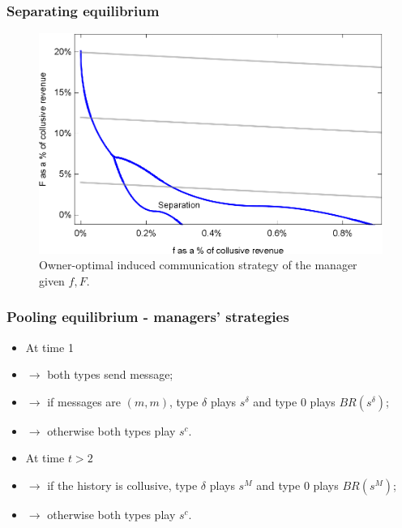 \documentclass[xcolor=dvipsnames]{beamer}
\begin{document}
\begin{frame}
\frametitle{Separating equilibrium}
\begin{figure}[h!]
\centering
\includegraphics[scale=0.7]{Plots/com_f_F_lines_1_woe.eps}
\caption{Owner-optimal induced communication strategy of the manager given $f,F$.}\label{fig:fines}
\end{figure}
\end{frame}

\begin{frame}
\frametitle{Pooling equilibrium - managers' strategies}
	\begin{itemize}
		\item At time 1
		\item[] $\rightarrow$ both types send message;
		
		\item[] $\rightarrow$ if messages are $(m,m)$, type $\delta$ plays $s^\delta$ and type $0$ plays $BR(s^\delta)$; 
		
		\item[] $\rightarrow$ otherwise both types play $s^c$.
		
		\bigskip
		
		\item At time $t>2$
		
		\item[] $\rightarrow$ if the history is collusive, type $\delta$ plays $s^M$ and type $0$ plays $BR(s^M)$;
		
		\item[] $\rightarrow$ otherwise both types play $s^c$.
	\end{itemize}
\end{frame}
\end{document}
